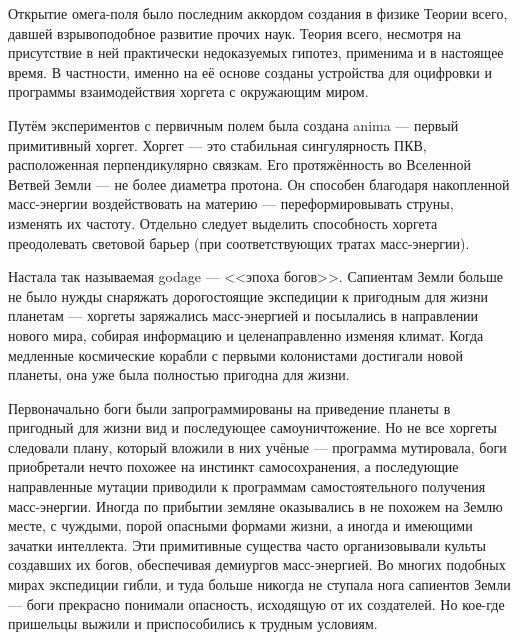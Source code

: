 \documentclass[a4paper,10pt]{book}
\begin{document}
Открытие омега-поля было последним
аккордом создания в физике Теории всего, давшей взрывоподобное развитие 
прочих наук. Теория всего, несмотря на присутствие в ней практически 
недоказуемых
гипотез, применима и в настоящее время. В частности, именно на её основе созданы
устройства для оцифровки и программы взаимодействия хоргета с окружающим миром. 

Путём экспериментов с первичным полем была создана 
anima --- первый примитивный хоргет. Хоргет --- это стабильная сингулярность 
ПКВ, расположенная перпендикулярно связкам. Его протяжённость во Вселенной 
Ветвей Земли --- не более диаметра протона. Он способен благодаря накопленной 
масс-энергии воздействовать на материю --- переформировывать струны, изменять 
их частоту.
Отдельно следует выделить способность хоргета преодолевать световой барьер (при 
соответствующих тратах масс-энергии).

Настала так называемая godage --- <<эпоха богов>>. Сапиентам Земли больше не 
было нужды снаряжать дорогостоящие экспедиции к пригодным для жизни планетам 
--- хоргеты заряжались масс-энергией и посылались в направлении нового мира, 
собирая информацию и целенаправленно изменяя климат. Когда медленные 
космические корабли с первыми колонистами достигали новой планеты, она уже была 
полностью пригодна для жизни.

Первоначально боги были запрограммированы на приведение планеты в пригодный для 
жизни вид и последующее самоуничтожение. Но не все хоргеты следовали плану, 
который вложили в них учёные --- программа мутировала, боги приобретали нечто 
похожее на инстинкт самосохранения, а последующие направленные мутации 
приводили 
к программам самостоятельного получения масс-энергии. Иногда по прибытии 
земляне 
оказывались в не похожем на Землю месте, с чуждыми, порой опасными формами 
жизни, а иногда и имеющими зачатки интеллекта. Эти примитивные существа часто 
организовывали культы создавших их богов, обеспечивая  демиургов масс-энергией. 
Во многих подобных мирах экспедиции гибли, и туда больше никогда не ступала 
нога 
сапиентов Земли --- боги прекрасно понимали опасность, исходящую от их 
создателей. 
Но кое-где пришельцы выжили и приспособились к трудным условиям.
\end{document}
